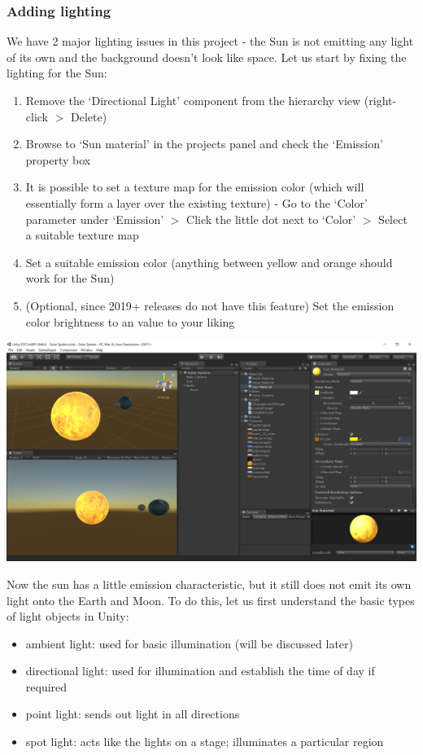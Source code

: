 \documentclass{article}[a4paper,12pt]
\theoremstyle{definition}
\begin{document}
\subsubsection{Adding lighting}
We have 2 major lighting issues in this project - the Sun is not emitting any light of its own and the background doesn't look like space. Let us start by fixing the lighting for the Sun:
\begin{enumerate}
	\item Remove the `Directional Light' component from the hierarchy view (right-click $>$ Delete)
	\item Browse to `Sun material' in the projects panel and check the `Emission' property box
	\item It is possible to set a texture map for the emission color (which will essentially form a layer over the existing texture) - Go to the `Color' parameter under `Emission' $>$ Click the little dot next to `Color' $>$ Select a suitable texture map
	\item Set a suitable emission color (anything between yellow and orange should work for the Sun)
	\item (Optional, since 2019+ releases do not have this feature) Set the emission color brightness to an value to your liking
\end{enumerate}
\begin{center}\includegraphics[width=\textwidth]{sun_emission.png}\end{center}
Now the sun has a little emission characteristic, but it still does not emit its own light onto the Earth and Moon. To do this, let us first understand the basic types of light objects in Unity:
\begin{itemize}
	\item ambient light: used for basic illumination (will be discussed later)
	\item directional light: used for illumination and establish the time of day if required
	\item point light: sends out light in all directions
	\item spot light: acts like the lights on a stage; illuminates a particular region
\end{itemize}
\end{document}
